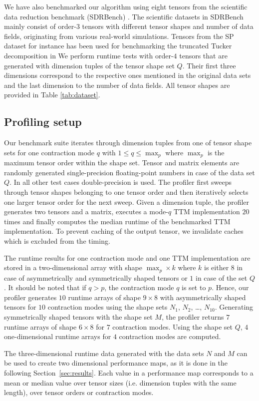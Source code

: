 We have also benchmarked our algorithm using eight tensors from the scientific data reduction benchmark (SDRBench) \cite{zhao:2020:sdrbench}.
The scientific datasets in SDRBench mainly consist of order-$3$ tensors with different tensor shapes and number of data fields, originating from various real-world simulations.
Tensors from the SP dataset for instance has been used for benchmarking the truncated Tucker decomposition in \cite{ballard:2020:tuckermpi}
We perform runtime tests with order-$4$ tensors that are generated with dimension tuples of the tensor shape set $Q$.
Their first three dimensions correspond to the respective ones mentioned in the original data sets and the last dimension to the number of data fields.
All tensor shapes are provided in Table \ref{tab:dataset}.


\subsection{Profiling setup} 
Our benchmark suite iterates through dimension tuples from one of tensor shape sets for one contraction mode $q$ with $1 \leq q \leq \max_p$ where $\max_p$ is the maximum tensor order within the shape set.
Tensor and matrix elements are randomly generated single-precision floating-point numbers in case of the data set $Q$.
In all other test cases double-precision is used.
The profiler first sweeps through tensor shapes belonging to one tensor order and then iteratively selects one larger tensor order for the next sweep.
Given a dimension tuple, the profiler generates two tensors and a matrix, executes a mode-$q$ TTM implementation $20$ times and finally computes the median runtime of the benchmarked TTM implementation.
To prevent caching of the output tensor, we invalidate caches which is excluded from the timing.
 
The runtime results for one contraction mode and one TTM implementation are stored in a two-dimensional array with shape $\max_p \times k$ where $k$ is either $8$ in case of asymmetrically and symmetrically shaped tensors or $1$ in case of the set $Q$.
It should be noted that if $q>p$, the contraction mode $q$ is set to $p$.
Hence, our profiler generates $10$ runtime arrays of shape $9\times 8$ with asymmetrically shaped tensors for $10$ contraction modes using the shape sets $N_1$, $N_2$, \dots, $N_{10}$.
Generating symmetrically shaped tensors with the shape set $M$, the profiler returns $7$ runtime arrays of shape $6 \times 8$ for $7$ contraction modes.
Using the shape set $Q$, $4$ one-dimensional runtime arrays for $4$ contraction modes are computed.

The three-dimensional runtime data generated with the data sets $N$ and $M$ can be used to create two dimensional performance maps, as it is done in the following Section~\ref{sec:results}.
Each value in a performance map corresponds to a mean or median value over tensor sizes (i.e. dimension tuples with the same length), over tensor orders or contraction modes.
